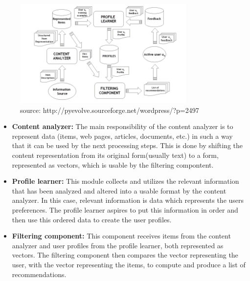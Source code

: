 \begin{figure}[H]
\centering
\includegraphics[width=90mm]{Pictures/contentdescription.png}
\caption{source: http://pyevolve.sourceforge.net/wordpress/?p=2497}
\label{contentdescription}
\end{figure}
\begin{itemize}
	\item \textbf{Content analyzer:}
	The main responsibility of the content analyzer is to represent data (items, web pages, articles, documents, etc.) in such a way that it can be used by the next processing steps. This is done by shifting the content representation from its original form(usually text) to a form, represented as vectors, which is usable by the filtering compontent.
	
	\item \textbf{Profile learner:} This module collects and utilizes the relevant information that has been analyzed and altered into a usable format by the content analyzer. In this case, relevant information is data which represents the users preferences. The profile learner aspires to put this information in order and then use this ordered data to create the user profiles.
	
	\item \textbf{Filtering component:} This component receives items from the content analyzer and user profiles from the profile learner, both represented as vectors. The filtering component then compares the vector representing the user, with the vector representing the items, to compute and produce a list of recommendations. 
\end{itemize}


